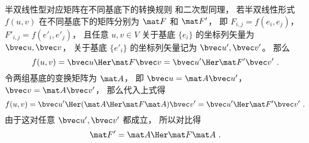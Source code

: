 \begin{example}{半双线性型对应矩阵在不同基底下的转换规则}\label{ex_sequil_1}
和二次型同理， 若半双线性形式 $f(u, v)$ 在不同基底下的矩阵分别为 $\mat F$ 和 $\mat F'$， 即 $F_{i,j} = f(e_i, e_j)$， $F'_{i,j} = f(e'_i, e'_j)$， 且任意 $u, v\in V$ 关于基底 $\{e_i\}$ 的坐标列矢量为 $\bvec u, \bvec v$， 关于基底 $\{e'_i\}$ 的坐标列矢量记为 $\bvec u', \bvec v'$。 那么
\begin{equation}
f(u, v) = \bvec u\Her \mat F \bvec v = {\bvec u'}\Her \mat F' \bvec v'~.
\end{equation}
令两组基底的变换矩阵为 $\mat A$， 即 $\bvec u = \mat A\bvec u'$， $\bvec v = \mat A \bvec v'$， 那么代入上式得
\begin{equation}
f(u, v) = {\bvec u'}\Her (\mat A\Her \mat F \mat A) \bvec v' = {\bvec u'}\Her \mat F' \bvec v'~.
\end{equation}
由于这对任意 $\bvec u', \bvec v'$ 都成立， 所以对比得
\begin{equation}
\mat F' = \mat A\Her \mat F \mat A~.
\end{equation}
\end{example}
